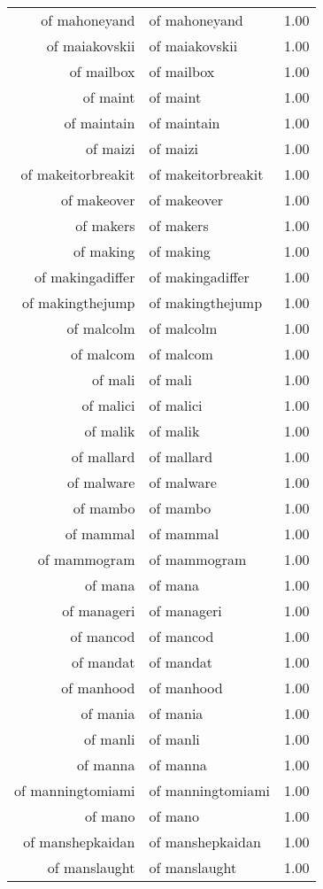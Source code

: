 \begin{table}[ht]
\begin{tabular}{rlr}
  of mahoneyand & of mahoneyand & 1.00 \\ 
  of maiakovskii & of maiakovskii & 1.00 \\ 
  of mailbox & of mailbox & 1.00 \\ 
  of maint & of maint & 1.00 \\ 
  of maintain & of maintain & 1.00 \\ 
  of maizi & of maizi & 1.00 \\ 
  of makeitorbreakit & of makeitorbreakit & 1.00 \\ 
  of makeover & of makeover & 1.00 \\ 
  of makers & of makers & 1.00 \\ 
  of making & of making & 1.00 \\ 
  of makingadiffer & of makingadiffer & 1.00 \\ 
  of makingthejump & of makingthejump & 1.00 \\ 
  of malcolm & of malcolm & 1.00 \\ 
  of malcom & of malcom & 1.00 \\ 
  of mali & of mali & 1.00 \\ 
  of malici & of malici & 1.00 \\ 
  of malik & of malik & 1.00 \\ 
  of mallard & of mallard & 1.00 \\ 
  of malware & of malware & 1.00 \\ 
  of mambo & of mambo & 1.00 \\ 
  of mammal & of mammal & 1.00 \\ 
  of mammogram & of mammogram & 1.00 \\ 
  of mana & of mana & 1.00 \\ 
  of manageri & of manageri & 1.00 \\ 
  of mancod & of mancod & 1.00 \\ 
  of mandat & of mandat & 1.00 \\ 
  of manhood & of manhood & 1.00 \\ 
  of mania & of mania & 1.00 \\ 
  of manli & of manli & 1.00 \\ 
  of manna & of manna & 1.00 \\ 
  of manningtomiami & of manningtomiami & 1.00 \\ 
  of mano & of mano & 1.00 \\ 
  of manshepkaidan & of manshepkaidan & 1.00 \\ 
  of manslaught & of manslaught & 1.00 \\ 

\end{tabular}
\end{table}
